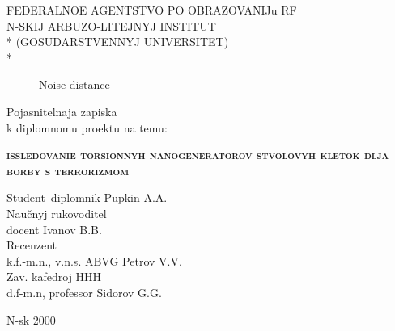 \begin{titlepage}
\newpage

\begin{center}
FEDERALNOE AGENTSTVO PO OBRAZOVANIJu RF \\
\vspace{1cm}
N-SKIJ ARBUZO-LITEJNYJ INSTITUT \\*
(GOSUDARSTVENNYJ UNIVERSITET) \\*
\hrulefill
\end{center}


\vspace{10em}

\begin{figure}[h]
\vspace{1cm} 
\caption{Noise-distance}
\label{fig:skku} %
\end{figure}

\begin{center}
\Large Pojasnitelnaja zapiska \\ k diplomnomu proektu na temu:
\end{center}

\vspace{2.5em}

\begin{center}
\textsc{\textbf{issledovanie torsionnyh nanogeneratorov \linebreak stvolovyh kletok dlja borby s terrorizmom}}
\end{center}



\vspace{6em}

\begin{flushleft}
Student--diplomnik \hrulefill Pupkin A.A. \\
\vspace{1.5em}
Naučnyj rukovoditel \\
docent \hrulefill Ivanov B.B.\\
\vspace{1.5em}
Recenzent \\
k.f.-m.n., v.n.s. ABVG \hrulefill Petrov V.V.\\
\vspace{1.5em}
Zav. kafedroj HHH \\
d.f-m.n, professor \hrulefill Sidorov G.G.
\end{flushleft}

\vspace{\fill}

\begin{center}
N-sk 2000
\end{center}

\end{titlepage}